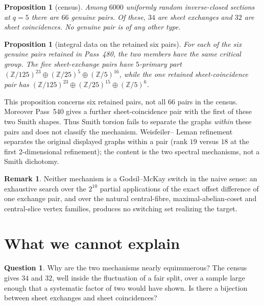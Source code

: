 \documentclass[11pt]{article}
\theoremstyle{plain}
\newtheorem{proposition}[theorem]{Proposition}
\theoremstyle{definition}
\newtheorem{question}[theorem]{Question}
\newtheorem{remark}[theorem]{Remark}
\newcommand{\ZZ}{\mathbb Z}
\begin{document}
\begin{proposition}[census]\label{prop:census}
Among $6000$ uniformly random inverse-closed sections at $q=5$ there are $66$
genuine pairs. Of these, $34$ are sheet exchanges and $32$ are sheet
coincidences. No genuine pair is of any other type.
\end{proposition}

\begin{proposition}[integral data on the retained six pairs]\label{prop:smith}
For each of the six genuine pairs retained in Pass~480, the two members have
the same critical group. The five sheet-exchange pairs have $5$-primary part
$(\ZZ/125)^{23}\oplus(\ZZ/25)^{5}\oplus(\ZZ/5)^{16}$, while the one retained
sheet-coincidence pair has
$(\ZZ/125)^{23}\oplus(\ZZ/25)^{15}\oplus(\ZZ/5)^{6}$.
\end{proposition}

This proposition concerns six retained pairs, not all $66$ pairs in the census.
Moreover Pass~540 gives a further sheet-coincidence pair with the first of
these two Smith shapes. Thus Smith torsion fails to separate the graphs
\emph{within} these pairs and does not classify the mechanism. Weisfeiler--
Leman refinement separates the original displayed graphs within a pair (rank
$19$ versus $18$ at the first $2$-dimensional refinement); the content is the
two spectral mechanisms, not a Smith dichotomy.

\begin{remark}
Neither mechanism is a Godsil--McKay switch in the naive sense: an exhaustive
search over the $2^{10}$ partial applications of the exact offset difference
of one exchange pair, and over the natural central-fibre, maximal-abelian-coset
and central-slice vertex families, produces no switching set realizing the
target.
\end{remark}

\section{What we cannot explain}

\begin{question}\label{q:rates}
Why are the two mechanisms nearly equinumerous? The census gives $34$ and
$32$, well inside the fluctuation of a fair split, over a sample large enough
that a systematic factor of two would have shown. Is there a bijection between
sheet exchanges and sheet coincidences?
\end{question}
\end{document}
